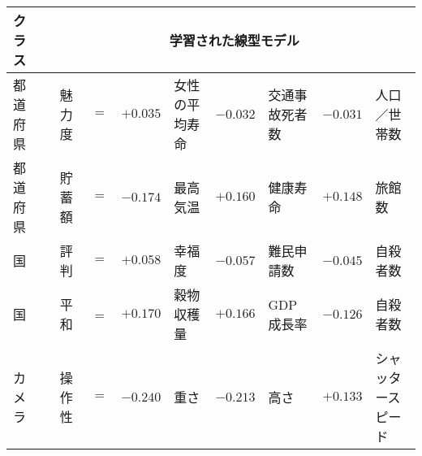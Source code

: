 \begin{tabular}{l p{1em} l c c l c l c l }
\toprule
クラス&&\multicolumn{8}{c}{学習された線型モデル}\\
\midrule
都道府県&&魅力度&$=$&$+0.035$&女性の平均寿命&$-0.032$&交通事故死者数&$-0.031$&人口／世帯数\\
都道府県&&貯蓄額&$=$&$-0.174$&最高気温&$+0.160$&健康寿命&$+0.148$&旅館数\\
国&&評判&$=$&$+0.058$&幸福度 &$-0.057$&難民申請数& $-0.045$&自殺者数\\
国&&平和&=&$+0.170$&穀物収穫量&$+0.166$&GDP成長率&$-0.126$&自殺者数\\
カメラ&&操作性&$=$&$-0.240$&重さ&$-0.213$&高さ&$+ 0.133$&シャッタースピード\\
\bottomrule
\end{tabular}